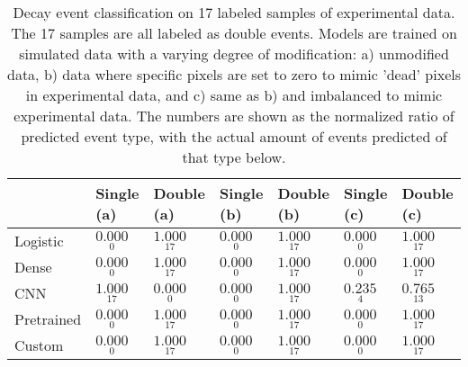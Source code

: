 \begin{table}
\centering
\caption{
Decay event classification on 17 labeled samples of experimental data. The 17 samples are all
labeled as double events. Models are trained on simulated data with a varying degree of modification:
a) unmodified data, b) data where specific pixels are set to zero to mimic
'dead' pixels in experimental data, and c) same as b) and imbalanced to mimic experimental data.
The numbers are shown as the normalized ratio of predicted event type, with the actual amount of
events predicted of that type below.
}
\label{tab:classification-experimental-labeled-doubles}
\begin{tabular}{lllllll}
\toprule
{} &                                 Single (a) &                                 Double (a) &                                Single (b) &                                 Double (b) &                                Single (c) &                                 Double (c) \\
\midrule
Logistic   &  $\underset{\num{ 0 }  }{\num{ 0.000 } }$ &  $\underset{\num{ 17 }  }{\num{ 1.000 } }$ &  $\underset{\num{ 0 }  }{\num{ 0.000 } }$ &  $\underset{\num{ 17 }  }{\num{ 1.000 } }$ &  $\underset{\num{ 0 }  }{\num{ 0.000 } }$ &  $\underset{\num{ 17 }  }{\num{ 1.000 } }$ \\
Dense      &  $\underset{\num{ 0 }  }{\num{ 0.000 } }$ &  $\underset{\num{ 17 }  }{\num{ 1.000 } }$ &  $\underset{\num{ 0 }  }{\num{ 0.000 } }$ &  $\underset{\num{ 17 }  }{\num{ 1.000 } }$ &  $\underset{\num{ 0 }  }{\num{ 0.000 } }$ &  $\underset{\num{ 17 }  }{\num{ 1.000 } }$ \\
CNN        &  $\underset{\num{ 17 }  }{\num{ 1.000 } }$ &  $\underset{\num{ 0 }  }{\num{ 0.000 } }$ &  $\underset{\num{ 0 }  }{\num{ 0.000 } }$ &  $\underset{\num{ 17 }  }{\num{ 1.000 } }$ &  $\underset{\num{ 4 }  }{\num{ 0.235 } }$ &  $\underset{\num{ 13 }  }{\num{ 0.765 } }$ \\
Pretrained &  $\underset{\num{ 0 }  }{\num{ 0.000 } }$ &  $\underset{\num{ 17 }  }{\num{ 1.000 } }$ &  $\underset{\num{ 0 }  }{\num{ 0.000 } }$ &  $\underset{\num{ 17 }  }{\num{ 1.000 } }$ &  $\underset{\num{ 0 }  }{\num{ 0.000 } }$ &  $\underset{\num{ 17 }  }{\num{ 1.000 } }$ \\
Custom     &  $\underset{\num{ 0 }  }{\num{ 0.000 } }$ &  $\underset{\num{ 17 }  }{\num{ 1.000 } }$ &  $\underset{\num{ 0 }  }{\num{ 0.000 } }$ &  $\underset{\num{ 17 }  }{\num{ 1.000 } }$ &  $\underset{\num{ 0 }  }{\num{ 0.000 } }$ &  $\underset{\num{ 17 }  }{\num{ 1.000 } }$ \\
\bottomrule
\end{tabular}
\end{table}
